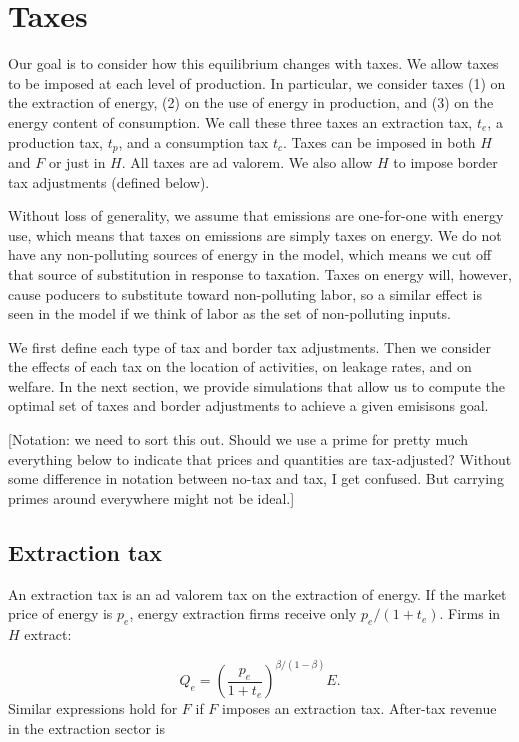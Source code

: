 \documentclass[notitlepage,12pt]{article}
\begin{document}
\section{Taxes}

Our goal is to consider how this equilibrium changes with taxes. We allow
taxes to be imposed at each level of production. In particular, we consider
taxes (1) on the extraction of energy, (2) on the use of energy in
production, and (3) on the energy content of consumption. We call these
three taxes an extraction tax, $t_{e}$, a production tax, $t_{p}$, and a
consumption tax $t_{c}$. Taxes can be imposed in both $H$ and $F$ or just in 
$H$. All taxes are ad valorem. We also allow $H$ to impose border tax
adjustments (defined below).

Without loss of generality, we assume that emissions are one-for-one with
energy use, which means that taxes on emissions are simply taxes on energy.
We do not have any non-polluting sources of energy in the model, which means
we cut off that source of substitution in response to taxation. Taxes on
energy will, however, cause poducers to substitute toward non-polluting
labor, so a similar effect is seen in the model if we think of labor as the
set of non-polluting inputs.

We first define each type of tax and border tax adjustments. Then we
consider the effects of each tax on the location of activities, on leakage
rates, and on welfare. In the next section, we provide simulations that
allow us to compute the optimal set of taxes and border adjustments to
achieve a given emisisons goal.

[Notation: we need to sort this out. Should we use a prime for pretty much
everything below to indicate that prices and quantities are tax-adjusted?
Without some difference in notation between no-tax and tax, I get confused.
But carrying primes around everywhere might not be ideal.]

\subsection{Extraction tax}

An extraction tax is an ad valorem tax on the extraction of energy. If the
market price of energy is $p_{e}$, energy extraction firms receive only $%
p_{e}/\left( 1+t_{e}\right) $. Firms in $H$ extract:

\begin{equation*}
Q_{e}=\left( \frac{p_{e}}{1+t_{e}}\right) ^{\beta /\left( 1-\beta \right) }E.
\end{equation*}%
Similar expressions hold for $F$ if $F$ imposes an extraction tax. After-tax
revenue in the extraction sector is
\end{document}
